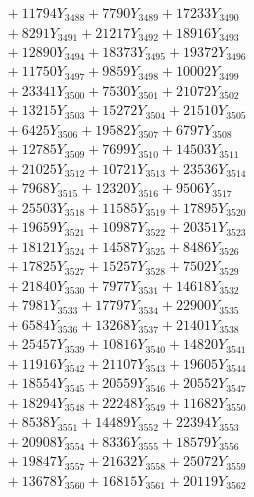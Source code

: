 \documentclass[a4paper,10pt]{article}
\begin{document}
{\begin{align}
&\;  + 11794 Y_{3488} + 7790 Y_{3489} + 17233 Y_{3490} \\[0.3ex]
&\;  + 8291 Y_{3491} + 21217 Y_{3492} + 18916 Y_{3493} \\[0.3ex]
&\;  + 12890 Y_{3494} + 18373 Y_{3495} + 19372 Y_{3496} \\[0.3ex]
&\;  + 11750 Y_{3497} + 9859 Y_{3498} + 10002 Y_{3499} \\[0.3ex]
&\;  + 23341 Y_{3500} + 7530 Y_{3501} + 21072 Y_{3502} \\[0.3ex]
&\;  + 13215 Y_{3503} + 15272 Y_{3504} + 21510 Y_{3505} \\[0.3ex]
&\;  + 6425 Y_{3506} + 19582 Y_{3507} + 6797 Y_{3508} \\[0.5ex]\allowbreak
&\;  + 12785 Y_{3509} + 7699 Y_{3510} + 14503 Y_{3511} \\[0.3ex]
&\;  + 21025 Y_{3512} + 10721 Y_{3513} + 23536 Y_{3514} \\[0.3ex]
&\;  + 7968 Y_{3515} + 12320 Y_{3516} + 9506 Y_{3517} \\[0.3ex]
&\;  + 25503 Y_{3518} + 11585 Y_{3519} + 17895 Y_{3520} \\[0.3ex]
&\;  + 19659 Y_{3521} + 10987 Y_{3522} + 20351 Y_{3523} \\[0.3ex]
&\;  + 18121 Y_{3524} + 14587 Y_{3525} + 8486 Y_{3526} \\[0.3ex]
&\;  + 17825 Y_{3527} + 15257 Y_{3528} + 7502 Y_{3529} \\[0.3ex]
&\;  + 21840 Y_{3530} + 7977 Y_{3531} + 14618 Y_{3532} \\[0.3ex]
&\;  + 7981 Y_{3533} + 17797 Y_{3534} + 22900 Y_{3535} \\[0.3ex]
&\;  + 6584 Y_{3536} + 13268 Y_{3537} + 21401 Y_{3538} \\[0.5ex]\allowbreak
&\;  + 25457 Y_{3539} + 10816 Y_{3540} + 14820 Y_{3541} \\[0.3ex]
&\;  + 11916 Y_{3542} + 21107 Y_{3543} + 19605 Y_{3544} \\[0.3ex]
&\;  + 18554 Y_{3545} + 20559 Y_{3546} + 20552 Y_{3547} \\[0.3ex]
&\;  + 18294 Y_{3548} + 22248 Y_{3549} + 11682 Y_{3550} \\[0.3ex]
&\;  + 8538 Y_{3551} + 14489 Y_{3552} + 22394 Y_{3553} \\[0.3ex]
&\;  + 20908 Y_{3554} + 8336 Y_{3555} + 18579 Y_{3556} \\[0.3ex]
&\;  + 19847 Y_{3557} + 21632 Y_{3558} + 25072 Y_{3559} \\[0.3ex]
&\;  + 13678 Y_{3560} + 16815 Y_{3561} + 20119 Y_{3562} \\[0.3ex]

\end{align}}
\end{document}
